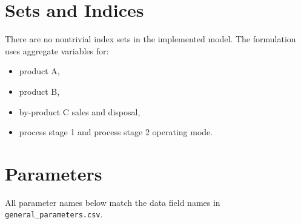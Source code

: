 \section*{Sets and Indices}

There are no nontrivial index sets in the implemented model. The formulation uses aggregate variables for:
\begin{itemize}
    \item product A,
    \item product B,
    \item by-product C sales and disposal,
    \item process stage 1 and process stage 2 operating mode.
\end{itemize}

\section*{Parameters}

All parameter names below match the data field names in \texttt{general\_parameters.csv}.

